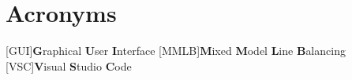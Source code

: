\pagestyle{plain}
{}
\listoffigures
\label{sec:Figures}

\newpage

\section*{Acronyms}
\label{sec:Acronym}

\begin{acronym}[MMLB]
	[GUI]{\textbf{G}raphical \textbf{U}ser \textbf{I}nterface}
	[MMLB]{\textbf{M}ixed \textbf{M}odel \textbf{L}ine \textbf{B}alancing}
	[VSC]{\textbf{V}isual \textbf{S}tudio \textbf{C}ode} \end{acronym}
